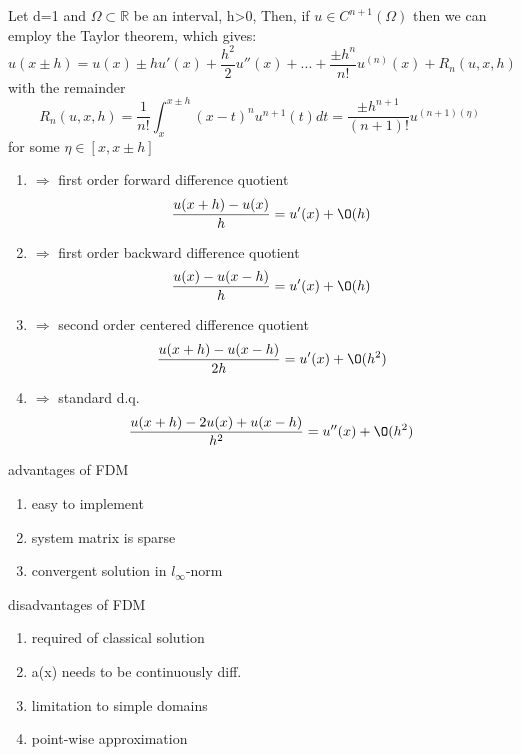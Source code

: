 \documentclass[english]{article}
\theoremstyle{definition}
\theoremstyle{remark}
\newcommand{\f}[2]{\frac{#1}{#2}}							%
\newcommand{\RR}{\mathbb{R}}			%
\newcommand{\OO}{\Omega}
\newcommand{\drw}{\Rightarrow}			%
\begin{document}
Let d=1 and $\OO\subset \RR$ be an interval, h>0, Then, if $u \in C^{n+1}(\OO)$ then we can employ the  Taylor theorem, which gives:
$$u(x\pm h) = u(x)\pm hu'(x) + \f{h^2}{2}u''(x) + ...+\f{\pm h^n}{n!}u^{(n)}(x)+ R_n(u,x,h)$$
with the remainder 
$$R_n(u,x,h)=\f{1}{n!}\int^{x\pm h}_x (x-t)^n u ^{n+1}(t)dt= \f{\pm h^{n+1}}{(n+1)!} u^{(n+1)(\eta)}$$
for some $\eta \in [x,x\pm h]$\\
\begin{enumerate}
\item $\drw$ first order forward difference quotient\\
  $$\f{u(x+h) -u(x)}{h}= u'(x) + \O(h)$$
\item $\drw$ first order backward difference quotient\\
  $$\f{u(x) -u(x-h)}{h}= u'(x) + \O(h)$$
\item $\drw$ second order centered difference quotient\\
  $$\f{u(x+h) -u(x-h)}{2h}= u'(x) + \O(h^2)$$
\item $\drw$ standard d.q.\\
  $$\f{u(x+h) -2u(x) +u(x-h)}{h^2}= u''(x) + \O(h^2)$$
\end{enumerate}
advantages of FDM
\begin{enumerate}
\item easy to implement
\item system matrix is sparse
\item convergent solution in $l_\infty$-norm
\end{enumerate}
disadvantages of FDM
\begin{enumerate}
\item required of classical solution
\item a(x) needs to be continuously diff.
\item limitation to simple domains
\item point-wise approximation
\end{enumerate}
\end{document}
